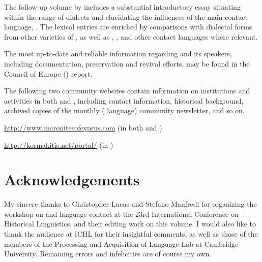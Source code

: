 \documentclass[output=paper]{langsci/langscibook}
\begin{document}
The follow-up volume by \citet{Borg2004} includes a substantial introductory essay situating  within the range of  dialects and elucidating the influences of the main contact language,  . The lexical entries are enriched by comparisons with dialectal forms from other varieties of , as well as , , and other contact languages where relevant.

The most up-to-date and reliable information regarding  and its speakers, including documentation, preservation and revival efforts, may be found in the Council of Europe (\citeyear{CouncilofEurope2017}) report.


The following two community websites contain information on  institutions and activities in both  and , including contact information, historical background, archived copies of the monthly ( language) community newsletter, and so on.

\url{http://www.maronitesofcyprus.com} (in both  and )


\url{http://kormakitis.net/portal/} (in )



\section*{Acknowledgements}
My sincere thanks to Christopher Lucas and Stefano Manfredi for organizing the workshop on  and language contact at the 23rd International Conference on Historical Linguistics, and their editing work on this volume. I would also like to thank the audience at ICHL for their insightful comments, as well as those of the members of the Processing and Acquisition of Language Lab at Cambridge University. Remaining errors and infelicities are of course my own.
\end{document}
